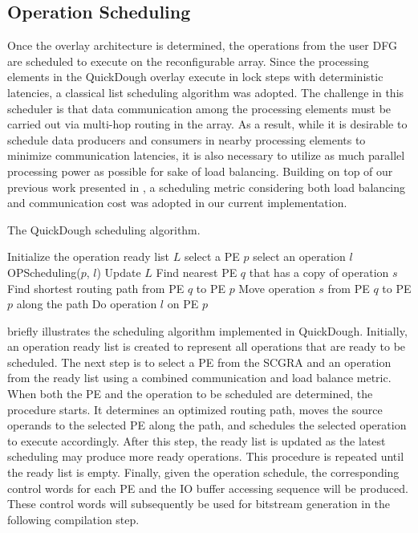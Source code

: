 \subsection{Operation Scheduling}
Once the overlay architecture is determined, the operations from the user DFG are scheduled to execute on the reconfigurable array.
Since the processing elements in the QuickDough overlay execute in lock steps with deterministic latencies, a classical list scheduling algorithm \cite{schutten1996list} was adopted.
The challenge in this scheduler is that data communication among the processing elements must be carried out via multi-hop routing in the array.
As a result, while it is desirable to schedule data producers and consumers in nearby processing elements to minimize communication latencies, it is also necessary to utilize as much parallel processing power as possible for sake of load balancing.
Building on top of our previous work presented in \cite{colinheart}, a scheduling metric considering both load balancing and communication cost was adopted in our current implementation.

 \begin{algorithm}
 \small
 \caption{The QuickDough scheduling algorithm.}
 \label{alg:scheduling}
 \begin{algorithmic}
 \STATE Initialize the operation ready list $L$
 \STATE select a PE $p$
 \STATE select an operation $l$
 \STATE OPScheduling($p$, $l$)
 \STATE Update $L$
 \ENDWHILE
 \ENDPROCEDURE
 \STATE
 \STATE Find nearest PE $q$ that has a copy of operation $s$
 \STATE Find shortest routing path from PE $q$ to PE $p$
 \STATE Move operation $s$ from PE $q$ to PE $p$ along the path
 \ENDFOR
 \STATE Do operation $l$ on PE $p$
 \ENDPROCEDURE

 \end{algorithmic}
 \end{algorithm}

 briefly illustrates the scheduling algorithm implemented in QuickDough. Initially, an operation ready list is created to represent all operations that are ready to be scheduled.
The next step is to select a PE from the SCGRA and an operation from the ready list using a combined communication and load balance metric.
When both the PE and the operation to be scheduled are determined, the  procedure starts. It determines an optimized routing path, moves the source operands to the selected PE along the path, and schedules the selected operation to execute accordingly.
After this step, the ready list is updated as the latest scheduling may produce more ready operations.
This  procedure is repeated until the ready list is empty.
Finally, given the operation schedule, the corresponding control words for each PE and the IO buffer accessing sequence will be produced.
These control words will subsequently be used for bitstream generation in the following compilation step.

